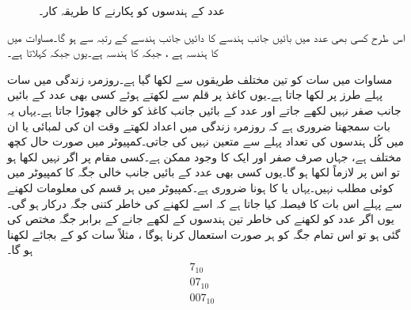 \begin{figure}
\centering
\begin{subfigure}{0.45\textwidth}
\centering
{}
\end{subfigure}\hfill
\begin{subfigure}{0.45\textwidth}
\centering
{}
\end{subfigure}
\caption{عدد کے ہندسوں کو پکارنے کا طریقہ کار۔}
\label{شکل_ثنائی_ہندسوں_کے_نام}
\end{figure}

اس طرح کسی بھی عدد میں بائیں جانب ہندسے کا  دائیں جانب ہندسے کے رتبہ سے   ہو گا۔مساوات  میں کا ہندسہ  ہے ، جبکہ  کا ہندسہ ہے۔یوں   جبکہ   کہلاتا ہے۔
	
مساوات  میں سات کو تین مختلف طریقوں سے لکھا گیا ہے۔روزمرہ زندگی میں سات پہلے طرز پر لکھا جاتا ہے۔یوں کاغذ پر  قلم سے لکھتے ہوئے کسی بھی عدد کے بائیں جانب   صفر نہیں لکھے جاتے اور عدد کے بائیں جانب کاغذ کو خالی چھوڑا جاتا ہے۔یہاں یہ بات سمجھنا ضروری ہے کہ روزمرہ زندگی میں اعداد لکھتے وقت ان کی لمبائی یا ان میں کُل ہندسوں کی تعداد پہلے سے متعین نہیں کی جاتی۔کمپیوٹر میں صورت حال  کچھ مختلف ہے، جہاں صرف صفر  اور ایک  کا وجود ممکن ہے۔کسی مقام پر اگر  نہیں لکھا ہو تو اس پر  لازماً  لکھا ہو گا۔یوں کسی بھی عدد کے بائیں جانب خالی جگہ کا کمپیوٹر میں کوئی مطلب نہیں۔یہاں  یا  کا ہونا ضروری ہے۔کمپیوٹر میں ہر قسم کی معلومات لکھنے سے پہلے اس بات کا فیصلہ کیا جاتا ہے کہ اسے لکھنے کی خاطر کتنی جگہ درکار ہو گی۔یوں اگر عدد کو لکھنے کی خاطر تین ہندسوں کے لکھے جانے کے برابر جگہ مختص کی گئی ہو تو اس تمام جگہ کو ہر صورت استعمال کرنا ہوگا ، مثلاً سات کو  کے بجائے  لکھنا ہو گا۔
\begin{gather}
\begin{aligned}\label{مساوات_ثنائی_ہندسوں}
7_{10} &\\
07_{10}&\\
007_{10}&
\end{aligned}
\end{gather}

